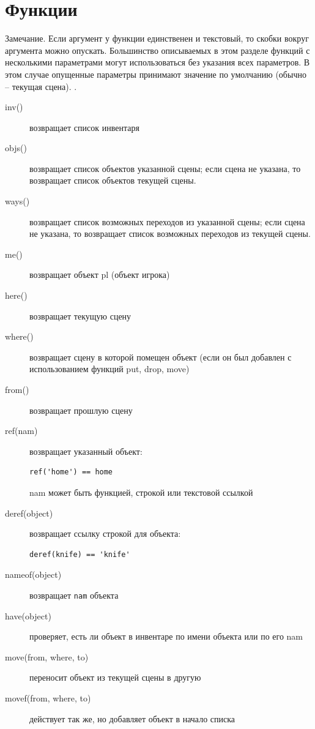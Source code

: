 \documentclass[12pt]{article}
\begin{document}
\section{Функции}
Замечание. Если аргумент у функции единственен и текстовый, то скобки вокруг аргумента можно опускать. Большинство описываемых в этом разделе функций с несколькими параметрами могут
использоваться без указания всех параметров. В этом случае опущенные параметры принимают значение по умолчанию (обычно -- текущая сцена).
.
\begin{description}
\item[inv()]  возвращает список инвентаря
\item[objs()]  возвращает список объектов указанной сцены; если сцена не указана, то возвращает список объектов текущей сцены.
\item[ways()]  возвращает список возможных переходов из  указанной сцены; если сцена не указана, то возвращает список возможных переходов из  текущей сцены.
\item[me()]  возвращает объект pl (объект игрока)
\item[here()]  возвращает текущую сцену
\item[where()]  возвращает сцену в которой помещен объект (если он был добавлен с использованием функций put, drop, move)
\item[from()]  возвращает прошлую сцену
\item[ref(nam)]  возвращает указанный объект: \begin{verbatim}ref('home') == home\end{verbatim} nam может быть функцией, строкой или текстовой ссылкой
\item[deref(object)]  возвращает ссылку строкой для объекта: \begin{verbatim}deref(knife) == 'knife'\end{verbatim}
\item[nameof(object)]  возвращает \verb/nam/ объекта
\item[have(object)]  проверяет, есть ли объект в инвентаре по имени объекта или по его nam
\item[move(from, where, to)]  переносит объект из текущей сцены в другую
\item[movef(from, where, to)]  действует так же, но добавляет объект в начало списка

\end{description}
\end{document}
